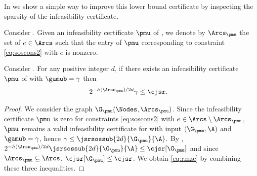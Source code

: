 \documentclass[11pt,twoside,a4paper,openright]{uclouvain-thesis}
\newcommand{\expfrac}[2]{#1/#2}
\begin{document}
In 
we show a simple way to improve this lower bound certificate
by inspecting the sparsity of the infeasibility certificate.


\begin{mydef}
  Consider .
  Given an infeasibility certificate $\pmu$ of ,
  we denote by \(\Arcs_{\pmu}\) the set of \arcs{} $e \in \Arcs$ such that
  the entry of $\pmu$ corresponding to constraint \eqref{eq:soscons2} with \arc{} $e$ is nonzero.
\end{mydef}

\begin{mytheo}
  \label{theo:fifth}
  Consider . For any positive integer $d$,
  if there exists an infeasibility certificate $\pmu$ of  with $\gamub = \gamma$
  then
  \begin{equation}
    \label{eq:rmze}
    2^{-\expfrac{h(\Arcs_{\pmu})}{2d}} \gamma \leq \cjsr.
  \end{equation}
  \begin{proof}
    We consider the graph $\G_{\pmu}(\Nodes,\Arcs_{\pmu})$.
    Since the infeasibility certificate $\pmu$ is zero for constraints \eqref{eq:soscons2} with \arcs{} $e \in \Arcs \setminus \Arcs_{\pmu}$,
    $\pmu$ remains a valid infeasibility certificate for  with input $(\G_{\pmu}, \A)$ and $\gamub = \gamma$,
    hence
    \( \gamma \leq \jsrsossub{2d}{\G_{\pmu}}{\A}. \)
    By , \( 2^{-\expfrac{h(\Arcs_{\pmu})}{2d}} \jsrsossub{2d}{\G_{\pmu}}{\A} \leq \cjsr[\G_{\pmu}] \)
    and since $\Arcs_{\pmu} \subseteq \Arcs$, $\cjsr[\G_{\pmu}] \leq \cjsr$.
    We obtain \eqref{eq:rmze} by combining these three inequalities.
  \end{proof}
\end{mytheo}
\end{document}
